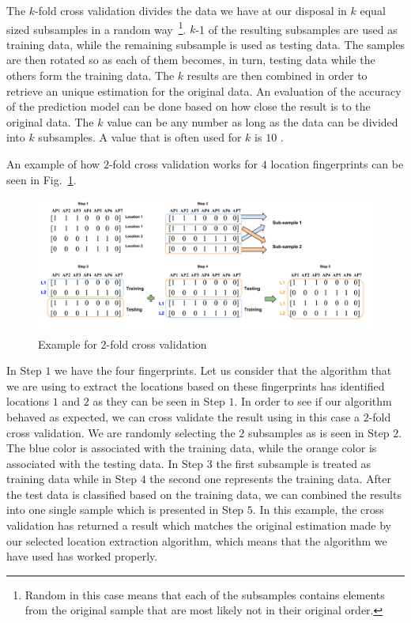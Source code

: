 The $k$-fold cross validation divides the data we have at our disposal in $k$
equal sized subsamples in a random way~\footnote{Random in this case means that
each of the subsamples contains elements from the original sample that are most
likely not in their original order.}. $k$-1 of the resulting subsamples are used
as training data, while the remaining subsample is used as testing data.
The samples are then rotated so as each of them becomes, in turn, testing data
while the others form the training data. The $k$ results are then combined in
order to retrieve an unique estimation for the original data. An evaluation of
the accuracy of the prediction model can be done based on how close the result
is to the original data. The $k$ value can be any number as long as the data can
be divided into $k$ subsamples. A value that is often used for $k$ is $10$
\cite{mclachlan2005analyzing}.

An example of how $2$-fold cross validation works for $4$ location fingerprints
can be seen in Fig.~\ref{2foldvalid}.

\begin{figure}[!h]
\centering
\includegraphics[width=\textwidth]{figures/kmeans/2-fold-validation.png}
\caption{Example for 2-fold cross validation}
\label{2foldvalid}
\end{figure}

In Step $1$ we have the four fingerprints. Let us consider that the algorithm
that we are using to extract the locations based on these fingerprints has
identified locations $1$ and $2$ as they can be seen in Step $1$. In order to
see if our algorithm behaved as expected, we can cross validate the result using
in this case a $2$-fold cross validation. We are randomly selecting the $2$
subsamples as is seen in Step $2$. The blue color is associated with the
training data, while the orange color is associated with the testing data. In
Step $3$ the first subsample is treated as training data while in Step $4$ the
second one represents the training data. After the test data is classified based
on the training data, we can combined the results into one single sample which
is presented in Step $5$. In this example, the cross validation has returned a
result which matches the original estimation made by our selected location
extraction algorithm, which means that the algorithm we have used has worked
properly.

